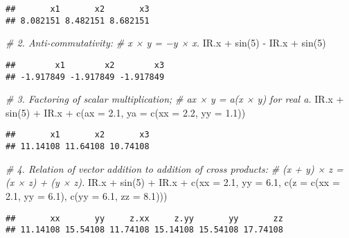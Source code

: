 \documentclass[
]{article}
\newenvironment{Shaded}{\begin{snugshade}}{\end{snugshade}}
\newcommand{\AttributeTok}[1]{\textcolor[rgb]{0.77,0.63,0.00}{#1}}
\newcommand{\CommentTok}[1]{\textcolor[rgb]{0.56,0.35,0.01}{\textit{#1}}}
\newcommand{\DecValTok}[1]{\textcolor[rgb]{0.00,0.00,0.81}{#1}}
\newcommand{\FloatTok}[1]{\textcolor[rgb]{0.00,0.00,0.81}{#1}}
\newcommand{\FunctionTok}[1]{\textcolor[rgb]{0.00,0.00,0.00}{#1}}
\newcommand{\NormalTok}[1]{#1}
\newcommand{\SpecialCharTok}[1]{\textcolor[rgb]{0.00,0.00,0.00}{#1}}
\begin{document}
\begin{verbatim}
##       x1       x2       x3 
## 8.082151 8.482151 8.682151
\end{verbatim}

\begin{Shaded}
\begin{Highlighting}[]
\CommentTok{\# 2. Anti{-}commutativity:}
\CommentTok{\# x × y = −y × x.}
\NormalTok{IR.x }\SpecialCharTok{+} \FunctionTok{sin}\NormalTok{(}\DecValTok{5}\NormalTok{) }\SpecialCharTok{{-}}\NormalTok{ IR.x }\SpecialCharTok{+} \FunctionTok{sin}\NormalTok{(}\DecValTok{5}\NormalTok{)}
\end{Highlighting}
\end{Shaded}

\begin{verbatim}
##        x1        x2        x3 
## -1.917849 -1.917849 -1.917849
\end{verbatim}

\begin{Shaded}
\begin{Highlighting}[]
\CommentTok{\# 3. Factoring of scalar multiplication;}
\CommentTok{\# ax × y = a(x × y) for real a.}
\NormalTok{IR.x }\SpecialCharTok{+} \FunctionTok{sin}\NormalTok{(}\DecValTok{5}\NormalTok{) }\SpecialCharTok{+}\NormalTok{ IR.x }\SpecialCharTok{+} \FunctionTok{c}\NormalTok{(}\AttributeTok{ax =} \FloatTok{2.1}\NormalTok{, }\AttributeTok{ya =} \FunctionTok{c}\NormalTok{(}\AttributeTok{xx =} \FloatTok{2.2}\NormalTok{, }\AttributeTok{yy =} \FloatTok{1.1}\NormalTok{))}
\end{Highlighting}
\end{Shaded}

\begin{verbatim}
##       x1       x2       x3 
## 11.14108 11.64108 10.74108
\end{verbatim}

\begin{Shaded}
\begin{Highlighting}[]
\CommentTok{\# 4. Relation of vector addition to addition of cross products:}
\CommentTok{\# (x + y) × z = (x × z) + (y × z).}
\NormalTok{IR.x }\SpecialCharTok{+} \FunctionTok{sin}\NormalTok{(}\DecValTok{5}\NormalTok{) }\SpecialCharTok{+}\NormalTok{ IR.x }\SpecialCharTok{+} \FunctionTok{c}\NormalTok{(}\AttributeTok{xx =} \FloatTok{2.1}\NormalTok{, }\AttributeTok{yy =} \FloatTok{6.1}\NormalTok{, }\FunctionTok{c}\NormalTok{(}\AttributeTok{z =} \FunctionTok{c}\NormalTok{(}\AttributeTok{xx =} \FloatTok{2.1}\NormalTok{, }\AttributeTok{yy =} \FloatTok{6.1}\NormalTok{), }
                                               \FunctionTok{c}\NormalTok{(}\AttributeTok{yy =} \FloatTok{6.1}\NormalTok{, }\AttributeTok{zz =} \FloatTok{8.1}\NormalTok{)))}
\end{Highlighting}
\end{Shaded}

\begin{verbatim}
##       xx       yy     z.xx     z.yy       yy       zz 
## 11.14108 15.54108 11.74108 15.14108 15.54108 17.74108
\end{verbatim}
\end{document}
